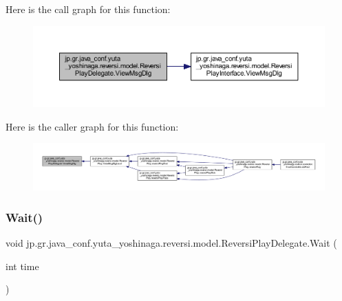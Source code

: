 Here is the call graph for this function\+:
\nopagebreak
\begin{figure}[H]
\begin{center}
\leavevmode
\includegraphics[width=350pt]{classjp_1_1gr_1_1java__conf_1_1yuta__yoshinaga_1_1reversi_1_1model_1_1_reversi_play_delegate_acdb644250451a30317ce0518191292a5_cgraph}
\end{center}
\end{figure}
Here is the caller graph for this function\+:
\nopagebreak
\begin{figure}[H]
\begin{center}
\leavevmode
\includegraphics[width=350pt]{classjp_1_1gr_1_1java__conf_1_1yuta__yoshinaga_1_1reversi_1_1model_1_1_reversi_play_delegate_acdb644250451a30317ce0518191292a5_icgraph}
\end{center}
\end{figure}
\mbox{\label{classjp_1_1gr_1_1java__conf_1_1yuta__yoshinaga_1_1reversi_1_1model_1_1_reversi_play_delegate_a1adfbc7bcedb4f06a5d3b1b30f13116b}} 
\subsubsection{\texorpdfstring{Wait()}{Wait()}}
{\footnotesize\ttfamily void jp.\+gr.\+java\+\_\+conf.\+yuta\+\_\+yoshinaga.\+reversi.\+model.\+Reversi\+Play\+Delegate.\+Wait (\begin{DoxyParamCaption}\item[{int}]{time }\end{DoxyParamCaption})}




